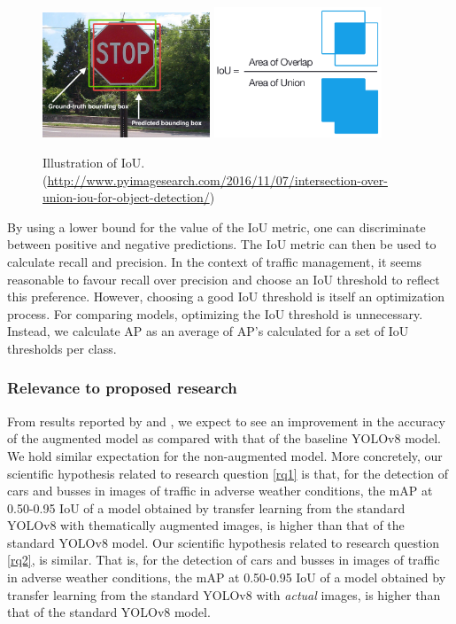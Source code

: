 \documentclass[]{article}
\begin{document}
	\begin{figure}[h]
		\centering
		\includegraphics[width=5cm]{Intersection_over_Union_-_object_detection_bounding_boxes.jpg}
		\includegraphics[width=5cm]{Intersection_over_Union_-_visual_equation.png}
		\caption{Illustration of IoU.\\ \footnotesize{(\url{http://www.pyimagesearch.com/2016/11/07/intersection-over-union-iou-for-object-detection/})}}
	\end{figure}
	
	By using a lower bound for the value of the IoU metric, one can discriminate between positive and negative predictions. The IoU metric can then be used to calculate recall and precision. In the context of traffic management, it seems reasonable to favour recall over precision and choose an IoU threshold to reflect this preference. However, choosing a good IoU threshold is itself an optimization process. For comparing models, optimizing the IoU threshold is unnecessary. Instead, we calculate AP as an average of AP's calculated for a set of IoU thresholds per class.
	
\subsubsection{Relevance to proposed research}
	
	From results reported by \cite{kumarObjectDetectionAdverse2023} and \cite{liVehicleDetectionFoggy2022}, we expect to see an improvement in the accuracy of the augmented model as compared with that of the baseline YOLO{\small v8} model. We hold similar expectation for the non-augmented model. More concretely, our scientific hypothesis related to research question \ref{rq1} is that, for the detection of cars and busses in images of traffic in adverse weather conditions, the mAP at 0.50-0.95 IoU of a model obtained by transfer learning from the standard YOLO{\small v8} with thematically augmented images, is higher than that of the standard YOLO{\small v8} model. Our scientific hypothesis related to research question \ref{rq2}, is similar. That is, for the detection of cars and busses in images of traffic in adverse weather conditions, the mAP at 0.50-0.95 IoU of a model obtained by transfer learning from the standard YOLO{\small v8} with  \textit{actual} images, is higher than that of the standard YOLO{\small v8} model.
\end{document}
